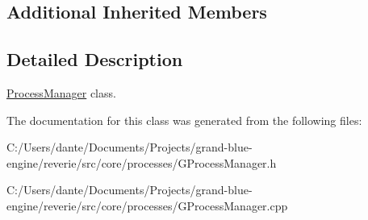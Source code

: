 \subsection*{Additional Inherited Members}


\subsection{Detailed Description}
\mbox{\hyperlink{classrev_1_1_process_manager}{Process\+Manager}} class. 

The documentation for this class was generated from the following files\+:\begin{DoxyCompactItemize}
\item 
C\+:/\+Users/dante/\+Documents/\+Projects/grand-\/blue-\/engine/reverie/src/core/processes/G\+Process\+Manager.\+h\item 
C\+:/\+Users/dante/\+Documents/\+Projects/grand-\/blue-\/engine/reverie/src/core/processes/G\+Process\+Manager.\+cpp\end{DoxyCompactItemize}
